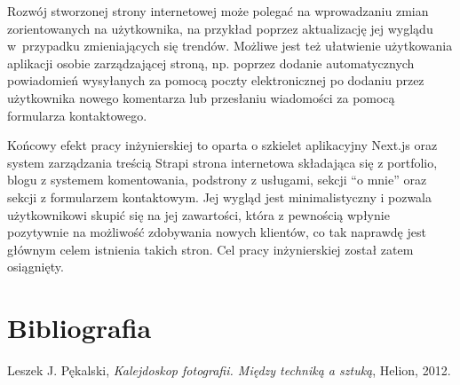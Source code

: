 \documentclass[a4paper, 12pt, twoside]{article}
\numberwithin{figure}{section}
\begin{document}
\begin{sloppypar}
Rozwój stworzonej strony internetowej może polegać na wprowadzaniu zmian zorientowanych na użytkownika, na przykład poprzez aktualizację jej wyglądu w~przypadku zmieniających się trendów. Możliwe jest też ułatwienie użytkowania aplikacji osobie zarządzającej stroną, np. poprzez dodanie automatycznych powiadomień wysyłanych za pomocą poczty elektronicznej po dodaniu przez użytkownika nowego komentarza lub przesłaniu wiadomości za pomocą formularza kontaktowego.

Końcowy efekt pracy inżynierskiej to oparta o szkielet aplikacyjny Next.js oraz system zarządzania treścią Strapi strona internetowa składająca się z portfolio, blogu z systemem komentowania, podstrony z usługami, sekcji ``o mnie'' oraz sekcji z formularzem kontaktowym. Jej wygląd jest minimalistyczny i pozwala użytkownikowi skupić się na jej zawartości, która z pewnością wpłynie pozytywnie na możliwość zdobywania nowych klientów, co tak naprawdę jest głównym celem istnienia takich stron. Cel pracy inżynierskiej został zatem osiągnięty.




\newpage 

%
    \listoffigures
    \clearpage


\newpage 

%
    \listoftables
    \clearpage


\newpage 

%
    \listofcodes
    \clearpage


\newpage 

\section*{Bibliografia}
    \renewcommand{\section}[2]{}
    
\begin{thebibliography}{99}

    Leszek J. Pękalski,
    \textit{Kalejdoskop fotografii. Między techniką a sztuką},
    Helion,
    2012.


\end{thebibliography}
\end{sloppypar}
\end{document}
